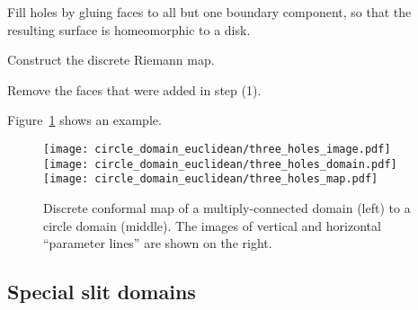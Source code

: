 \documentclass[Thesis]{subfiles}
\begin{document}
\begin{compactenum}[(1)]
\item Fill holes by gluing faces to all but one boundary component,
  so that the resulting surface is homeomorphic to a disk.
\item Construct the discrete Riemann map.
\item Remove the faces that were added in step (1). 
\end{compactenum}

Figure~\ref{fig:euclidean_circle_domain} shows an example.
\begin{figure}
\texttt{[image: circle\_domain\_euclidean/three\_holes\_image.pdf]}%
\texttt{[image: circle\_domain\_euclidean/three\_holes\_domain.pdf]}%
\texttt{[image: circle\_domain\_euclidean/three\_holes\_map.pdf]}%
\caption{
Discrete conformal map of a multiply-connected domain (left) to a
circle domain (middle). The images of vertical and horizontal ``parameter
lines'' are shown on the right.
}
\label{fig:euclidean_circle_domain}
\end{figure}


\subsection{Special slit domains}
\end{document}
